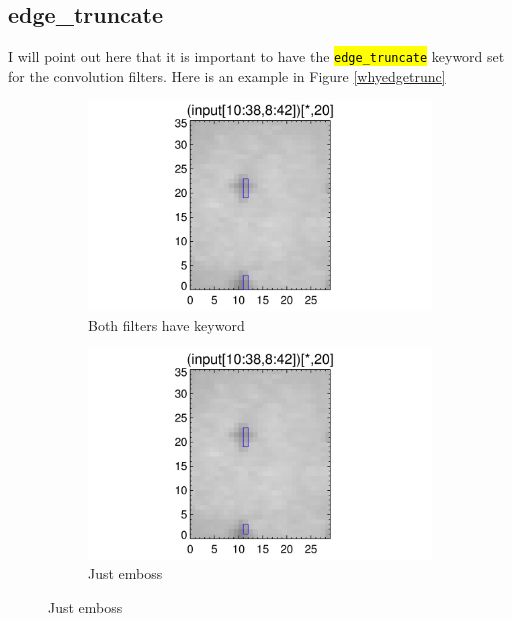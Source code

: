 \documentclass[10pt]{article}
\begin{document}
\subsection{edge\_truncate} %
\label{sub:edge_truncate}
I will point out here that it is important to have the \hl{\texttt{edge\_truncate}} keyword set for the convolution filters. Here is an example in Figure \ref{whyedgetrunc}

\begin{figure}[!h]
    \centering 
    \begin{subfigure}[b]{.45\linewidth}
        \centering
        \includegraphics[width=1.3\textwidth]{plots_tables_images/fidcheck_withbothtruncate0.png}
        \caption{Both filters have keyword}
    \end{subfigure}
    \begin{subfigure}[b]{.45\linewidth}
        \centering
        \includegraphics[width=1.3\textwidth]{plots_tables_images/fidcheck_withembosstruncate0.png}
        \caption{Just emboss}
    \end{subfigure}
   

\end{figure}
\end{document}

